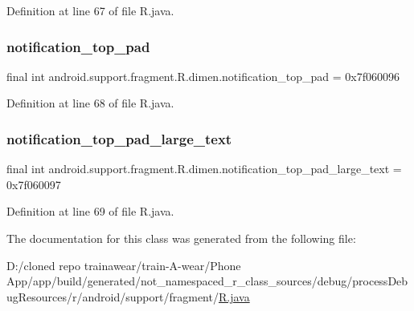 Definition at line 67 of file R.\+java.

\mbox{\label{classandroid_1_1support_1_1fragment_1_1_r_1_1dimen_acb45a60bdc254e38c8ede4c731c47388}} 
\subsubsection{\texorpdfstring{notification\_top\_pad}{notification\_top\_pad}}
{\footnotesize\ttfamily final int android.\+support.\+fragment.\+R.\+dimen.\+notification\+\_\+top\+\_\+pad = 0x7f060096\hspace{0.3cm}{\ttfamily [static]}}



Definition at line 68 of file R.\+java.

\mbox{\label{classandroid_1_1support_1_1fragment_1_1_r_1_1dimen_a4bbfb4f45a99edc54e4de12edb4b9572}} 
\subsubsection{\texorpdfstring{notification\_top\_pad\_large\_text}{notification\_top\_pad\_large\_text}}
{\footnotesize\ttfamily final int android.\+support.\+fragment.\+R.\+dimen.\+notification\+\_\+top\+\_\+pad\+\_\+large\+\_\+text = 0x7f060097\hspace{0.3cm}{\ttfamily [static]}}



Definition at line 69 of file R.\+java.



The documentation for this class was generated from the following file\+:\begin{DoxyCompactItemize}
\item 
D\+:/cloned repo trainawear/train-\/\+A-\/wear/\+Phone App/app/build/generated/not\+\_\+namespaced\+\_\+r\+\_\+class\+\_\+sources/debug/process\+Debug\+Resources/r/android/support/fragment/\mbox{\hyperlink{process_debug_resources_2r_2android_2support_2fragment_2_r_8java}{R.\+java}}\end{DoxyCompactItemize}
